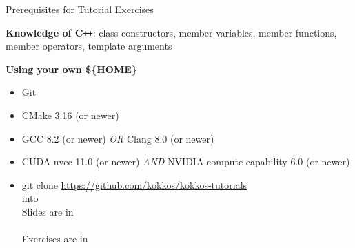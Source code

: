 




\begin{frame}{Prerequisites for Tutorial Exercises}

\textbf{Knowledge of C\texttt{++}}:
  class constructors, member variables, member functions, member operators, template arguments

\vspace{10pt}


\vspace{10pt}

\textbf{Using your own {\$\{HOME\}}}
\begin{scriptsize}
  \begin{itemize}
  \item {Git}
  \item {CMake 3.16 (or newer)}
  \item {GCC 8.2 (or newer)}
    \textit{OR} {Clang 8.0 (or newer)}
  \item {CUDA nvcc 11.0 (or newer)}
    \textit{AND} {NVIDIA compute capability 6.0 (or newer)}
  \item {git clone \url{https://github.com/kokkos/kokkos-tutorials} \\ \hspace{2pt}  into }
        \\ \vspace{4pt} \hspace{2pt} Slides are in \\ \hspace{8pt} 
        \\ \vspace{4pt} \hspace{2pt} Exercises are in \\ \hspace{8pt} 
  \end{itemize}
\end{scriptsize}

\end{frame}


